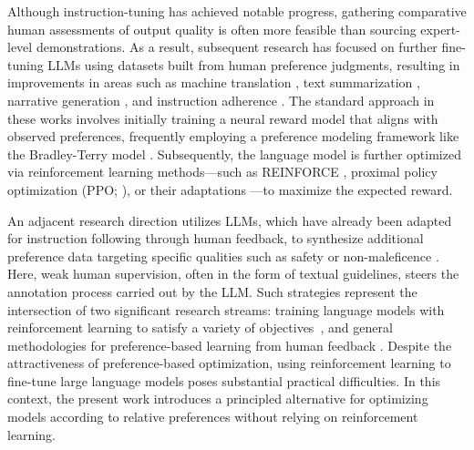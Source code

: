Although instruction-tuning has achieved notable progress, gathering comparative human assessments of output quality is often more feasible than sourcing expert-level demonstrations. As a result, subsequent research has focused on further fine-tuning LLMs using datasets built from human preference judgments, resulting in improvements in areas such as machine translation \citep{kreutzer-etal-2018-reliability}, text summarization \citep{stiennon2022learning,ziegler2020finetuning}, narrative generation \citep{ziegler2020finetuning}, and instruction adherence \citep{ouyang2022training,ramamurthy2023is}. The standard approach in these works involves initially training a neural reward model that aligns with observed preferences, frequently employing a preference modeling framework like the Bradley-Terry model \citep{bradley1952rankanalysis}. Subsequently, the language model is further optimized via reinforcement learning methods—such as REINFORCE \citep{williams1992reinforce}, proximal policy optimization (PPO; \cite{schulman2017proximal}), or their adaptations \citep{ramamurthy2023is}—to maximize the expected reward. 

An adjacent research direction utilizes LLMs, which have already been adapted for instruction following through human feedback, to synthesize additional preference data targeting specific qualities such as safety or non-maleficence \citep{bai2022constitutional}. Here, weak human supervision, often in the form of textual guidelines, steers the annotation process carried out by the LLM. Such strategies represent the intersection of two significant research streams: training language models with reinforcement learning to satisfy a variety of objectives~\citep{Ranzato2015SequenceLT,paulus2018a,wu2018learning}, and general methodologies for preference-based learning from human feedback \citep{christiano2017deep,kupcsik2018learning}. Despite the attractiveness of preference-based optimization, using reinforcement learning to fine-tune large language models poses substantial practical difficulties. In this context, the present work introduces a principled alternative for optimizing models according to relative preferences without relying on reinforcement learning.

